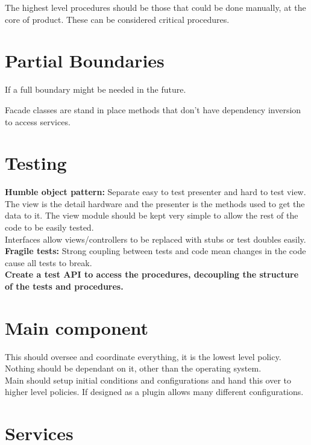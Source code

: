 \documentclass[11pt]{scrartcl} %
\begin{document}
The highest level procedures should be those that could be done manually, at the core of product.
These can be considered critical procedures.

\section{Partial Boundaries}

If a full boundary might be needed in the future.

Facade classes are stand in place methods that don't have dependency inversion to access services.

\section{Testing}

\textbf{Humble object pattern:} Separate easy to test presenter and hard to test view.\\

The view is the detail hardware and the presenter is the methods used to get the data to it. The view
module should be kept very simple to allow the rest of the code to be easily tested.\\

Interfaces allow views/controllers to be replaced with stubs or test doubles easily.\\

\textbf{Fragile tests:} Strong coupling between tests and code mean changes in the code cause all tests to break.\\

\textbf{Create a test API to access the procedures, decoupling the structure of the tests and procedures.}

\section{Main component}

This should oversee and coordinate everything, it is the lowest level policy. Nothing should be
dependant on it, other than the operating system.\\

Main should setup initial conditions and configurations and hand this over to higher level policies.
If designed as a plugin allows many different configurations.

\section{Services}
\end{document}
